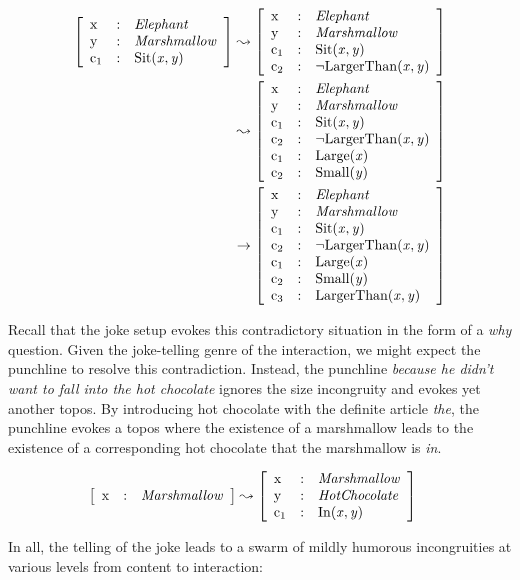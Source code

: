 \documentclass[a4]{scrartcl}
\let\lbl\operatorname
\newenvironment{ttr}{\left[\begin{array}{lcl}}{\end{array}\right]}
\newcommand{\tf}[2]{\lbl{#1} & : & \mathit{#2}\\}
\newcommand{\type}[1]{\ensuremath{\mathit{#1}}}
\newcommand{\ptype}[2]{\ensuremath{\mathrm{#1}(#2)}}
\begin{document}
\begin{align*}
\begin{ttr}
  \tf{x}{\type{Elephant}}
  \tf{y}{\type{Marshmallow}}
  \tf{c_1}{\ptype{Sit}{x,y}}
\end{ttr} & \leadsto
\begin{ttr}
  \tf{x}{\type{Elephant}}
  \tf{y}{\type{Marshmallow}}
  \tf{c_1}{\ptype{Sit}{x,y}}
  \tf{c_2}{\ptype{\lnot LargerThan}{x,y}}
\end{ttr}\\ & \leadsto
\begin{ttr}
  \tf{x}{\type{Elephant}}
  \tf{y}{\type{Marshmallow}}
  \tf{c_1}{\ptype{Sit}{x,y}}
  \tf{c_2}{\ptype{\lnot LargerThan}{x,y}}
  \tf{c_1}{\ptype{Large}{x}}
  \tf{c_2}{\ptype{Small}{y}}
\end{ttr} \\ & \rightarrow
\begin{ttr}
  \tf{x}{\type{Elephant}}
  \tf{y}{\type{Marshmallow}}
  \tf{c_1}{\ptype{Sit}{x,y}}
  \tf{c_2}{\ptype{\lnot LargerThan}{x,y}}
  \tf{c_1}{\ptype{Large}{x}}
  \tf{c_2}{\ptype{Small}{y}}
  \tf{c_3}{\ptype{LargerThan}{x,y}}
\end{ttr} 
\end{align*}

Recall that the joke setup evokes this contradictory situation in the
form of a \emph{why} question.
Given the joke-telling genre of the interaction,
we might expect the punchline to resolve this contradiction.
Instead, the punchline 
\textit{because he didn't want to fall into the hot chocolate}
ignores the size incongruity and evokes yet another topos.
By introducing hot chocolate with the definite article \textit{the},
the punchline evokes a topos where the existence of a marshmallow
leads to the existence of a corresponding hot chocolate that the marshmallow is \textit{in}.

\begin{align*}
\begin{ttr}
  \tf{x}{\type{Marshmallow}}
\end{ttr} & \leadsto
\begin{ttr}
  \tf{x}{\type{Marshmallow}}
  \tf{y}{\type{HotChocolate}}
  \tf{c_1}{\ptype{In}{x,y}}
\end{ttr}
\end{align*}

In all, the telling of the joke leads to a swarm of mildly humorous incongruities 
at various levels from content to interaction:
\end{document}

